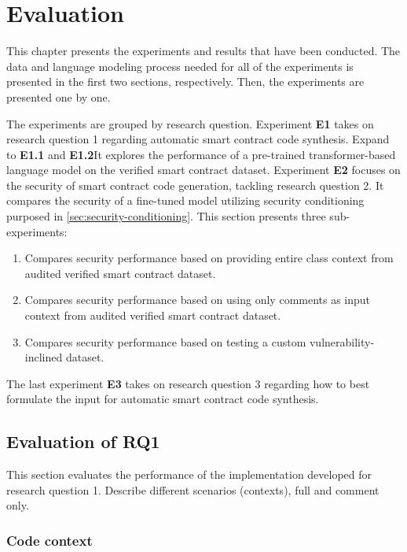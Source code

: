 
\chapter{Evaluation}
\label{chap:evaluation}
This chapter presents the experiments and results that have been conducted. The data and language modeling process needed for all of the experiments is presented in the first two sections, respectively. Then, the experiments are presented one by one. 

The experiments are grouped by research question. Experiment \textbf{E1} takes on research question 1 regarding automatic smart contract code synthesis. Expand to \textbf{E1.1} and \textbf{E1.2}It explores the performance of a pre-trained transformer-based language model on the verified smart contract dataset. Experiment \textbf{E2} focuses on the security of smart contract code generation, tackling research question 2. It compares the security of a fine-tuned model utilizing security conditioning purposed in \cref{sec:security-conditioning}. This section presents three sub-experiments:
\begin{enumerate}[label=\textbf{E2.\arabic*.}, leftmargin=1.5cm]
    \item Compares security performance based on providing entire class context from audited verified smart contract dataset.
    \item Compares security performance based on using only comments as input context from audited verified smart contract dataset.
    \item Compares security performance based on testing a custom vulnerability-inclined dataset.
\end{enumerate}
The last experiment \textbf{E3} takes on research question 3 regarding how to best formulate the input for automatic smart contract code synthesis.

\section{Evaluation of RQ1}
\label{sec:e1-automatic-smart-contract-code-synthesis}
This section evaluates the performance of the implementation developed for research question 1. Describe different scenarios  (contexts), full and comment only. 

\subsection{Code context}
